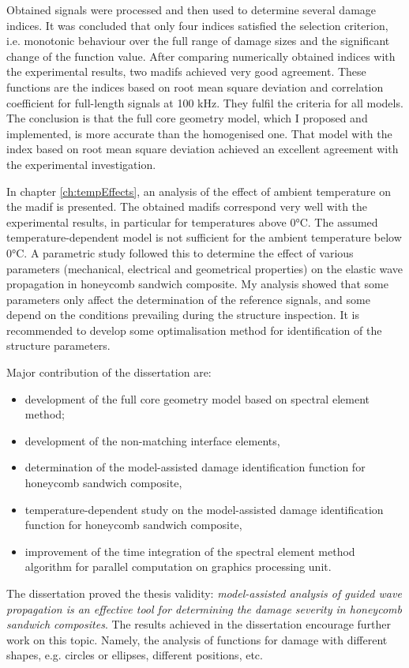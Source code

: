 Obtained signals were processed and then used to determine several damage indices.
It was concluded that only four indices satisfied the selection criterion, i.e. monotonic behaviour over the full range of damage sizes and the significant change of the function value.
After comparing numerically obtained indices with the experimental results, two \acfp{madif} achieved very good agreement.
These functions are the indices based on root mean square deviation and correlation coefficient for full-length signals at 100 \unit{\kHz}.
They fulfil the criteria for all models.
The conclusion is that the full core geometry model, which I proposed and implemented, is more accurate than the homogenised one.
That model with the index based on root mean square deviation achieved an excellent agreement with the experimental investigation.

In chapter \ref{ch:tempEffects}, an analysis of the effect of ambient temperature on the \ac{madif} is presented.
The obtained \acp{madif} correspond very well with the experimental results, in particular for temperatures above 0\unit{\degreeCelsius}.
The assumed temperature-dependent model is not sufficient for the ambient temperature below 0\unit{\degreeCelsius}.
A parametric study followed this to determine the effect of various parameters (mechanical, electrical and geometrical properties) on the elastic wave propagation in honeycomb sandwich composite. 
My analysis showed that some parameters only affect the determination of the reference signals, and some depend on the conditions prevailing during the structure inspection.
It is recommended to develop some optimalisation method for identification of the structure parameters.

Major contribution of the dissertation are:
\begin{itemize}
	\item development of the full core geometry model based on spectral element method;
	\item development of the non-matching interface elements,
	\item determination of the model-assisted damage identification function for honeycomb sandwich composite,
	\item temperature-dependent study on the model-assisted damage identification function for honeycomb sandwich composite,
	\item improvement of the time integration of the spectral element method algorithm for parallel computation on graphics processing unit.
\end{itemize}

The dissertation proved the thesis validity: \textit{model-assisted analysis of guided wave propagation is an effective tool for determining the damage severity in honeycomb sandwich composites}.
The results achieved in the dissertation encourage further work on this topic.
Namely, the analysis of functions for damage with different shapes, e.g. circles or ellipses, different positions, etc.
